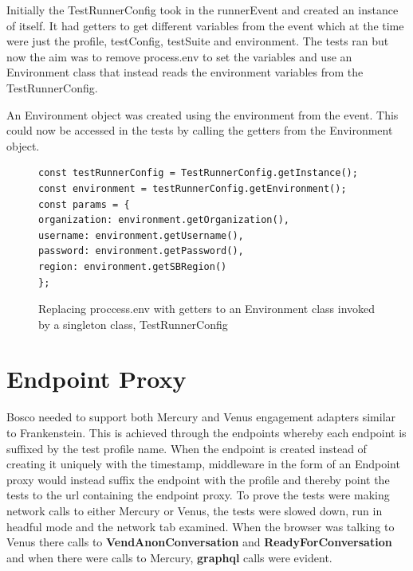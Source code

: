 \documentclass[12pt,a4paper,titlepage]{report}
\begin{document}
Initially the TestRunnerConfig took in the runnerEvent and created an instance of itself. It had getters to get different variables from the event which at the time were just the profile, testConfig, testSuite and environment. The tests ran but now the aim was to remove process.env to set the variables and use an Environment class that instead reads the environment variables from the TestRunnerConfig.

An Environment object was created using the environment from the event. This could now be accessed in the tests by calling the getters from the Environment object.
\begin{figure}[H]
 \begin{tcolorbox}
  \begin{verbatim}
const testRunnerConfig = TestRunnerConfig.getInstance();
const environment = testRunnerConfig.getEnvironment();
const params = {
organization: environment.getOrganization(),
username: environment.getUsername(),
password: environment.getPassword(),
region: environment.getSBRegion()
};
\end{verbatim}
 \end{tcolorbox}
 \caption{Replacing proccess.env with getters to an Environment class invoked by a singleton class, TestRunnerConfig}
\end{figure}

\section{Endpoint Proxy}

Bosco needed to support both Mercury and Venus engagement adapters similar to Frankenstein. This is achieved through the endpoints whereby 
each endpoint is suffixed by the test profile name. When the endpoint is created instead of creating it uniquely with the timestamp, middleware 
in the form of an Endpoint proxy would instead suffix the endpoint with the profile and thereby point the tests to the url 
containing the endpoint proxy. To prove the tests were making network calls to either Mercury or Venus, the tests were slowed down, run in headful mode and 
the network tab examined. When the browser was talking to Venus there calls to \textbf{VendAnonConversation} and \textbf{ReadyForConversation} and when there were calls to Mercury, \textbf{graphql} calls were evident.
\end{document}
